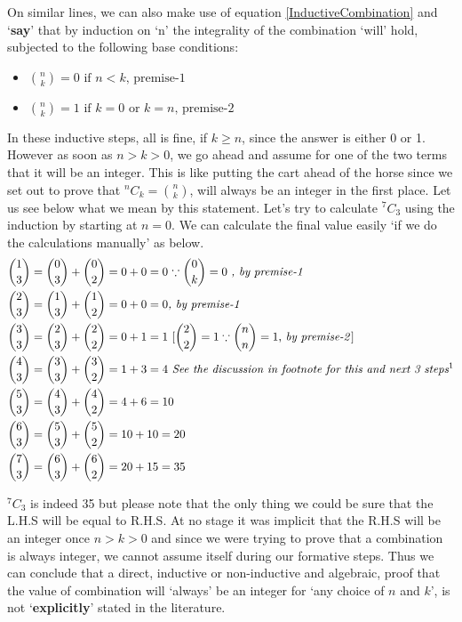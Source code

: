 \documentclass[10pt, twoside]{article}
\newcommand*{\Combination}[2]{{}^{#1}C_{#2}}%
\begin{document}
	On similar lines, we can also make use of equation \eqref{InductiveCombination} and `\textbf{say}' that by induction on `n' the integrality of the combination `will' hold, subjected to the following base conditions:
	\begin{itemize}
	\item $\displaystyle \binom{n}{k} = 0 \text{ if $n < k$, premise-1}$
	\item $\displaystyle \binom{n}{k} = 1 \text{ if $k=0$ or $k=n$, premise-2}$
	\end{itemize}
	In these inductive steps, all is fine, if $k \geq n$, since the answer is either 0 or 1. However as soon as $n > k > 0$, we go ahead and assume for one of the two terms that it will be an integer. This is like putting the cart ahead of the horse since we set out to prove that $\Combination{n}{k} = \binom{n}{k}$, will always be an integer in the first place. Let us see below what we mean by this statement. Let's try to calculate $\Combination{7}{3}$ using the induction by starting at $n=0$. We can calculate the final value easily `if we do the calculations manually' as below.
	\begin{align*}
	 \binom{1}{3} &= \binom{0}{3} + \binom{0}{2} = 0 + 0 = 0 \text{   $\because  \binom{0}{k}=0$ } \textit{, by premise-1}\\
	 \binom{2}{3} &= \binom{1}{3} + \binom{1}{2} = 0 + 0 = 0 \textit{, by premise-1}\\
	 \binom{3}{3} &= \binom{2}{3} + \binom{2}{2} = 0 + 1 = 1 \text{   [$\binom{2}{2}=1 \because  \binom{n}{n}=1$,\textit{ by premise-2}] } \\
	 \binom{4}{3} &= \binom{3}{3} + \binom{3}{2} = 1 + 3 = 4 \textit{ See the discussion in footnote for this and next 3 steps\footnotemark}\\
	 \binom{5}{3} &= \binom{4}{3} + \binom{4}{2} = 4 + 6 = 10 \\
	 \binom{6}{3} &= \binom{5}{3} + \binom{5}{2} = 10 + 10 = 20 \\
	 \binom{7}{3} &= \binom{6}{3} + \binom{6}{2} = 20 + 15 = 35	 	  	 	 
	\end{align*}
	
	$\Combination{7}{3}$ is indeed 35 but please note that the only thing we could be sure that the L.H.S will be equal to R.H.S. At no stage it was implicit that the R.H.S will be an integer once $n > k > 0$ and since we were trying to prove that a combination is always integer, we cannot assume itself during our formative steps. Thus we can conclude that a direct, inductive or non-inductive and algebraic, proof that the value of combination will `always' be an integer for `any choice of $n$ and $k$', is not `\textbf{explicitly}' stated in the literature.  
	
\end{document}
